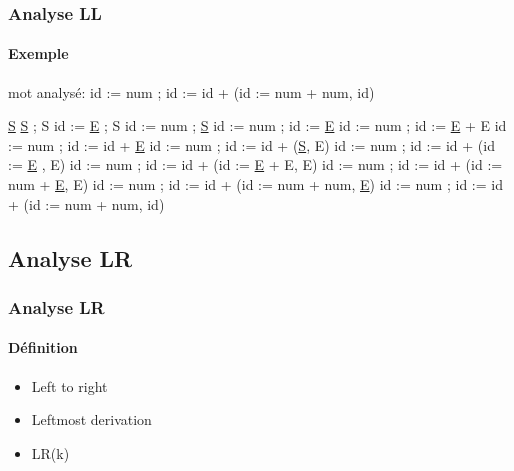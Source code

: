 \documentclass{beamer}
\begin{document}
\begin{frame}\frametitle{Analyse LL}\framesubtitle{Exemple}

	mot analysé:   id := num ; id := id + (id := num + num, id)

	\newline\newline
	\underline{S}\newline
	\underline{S} ; S\newline
	id := \underline{E} ; S\newline
	id := num ; \underline{S}\newline
	id := num ; id := \underline{E}\newline
	id := num ; id := \underline{E} + E\newline
	id := num ; id := id + \underline{E}\newline
	id := num ; id := id + (\underline{S}, E)\newline
	id := num ; id := id + (id := \underline{E} , E)\newline
	id := num ; id := id + (id := \underline{E} + E, E)\newline
	id := num ; id := id + (id := num + \underline{E}, E)\newline
	id := num ; id := id + (id := num + num, \underline{E})\newline
	id := num ; id := id + (id := num + num, id)\newline

\end{frame}

\subsection{Analyse LR}

\begin{frame}\frametitle{Analyse LR}\framesubtitle{Définition}

	\begin{itemize}
				\item Left to right\newline
				\item Leftmost derivation\newline
				\item LR(k)\newline
	\end{itemize}

\end{frame}
\end{document}
